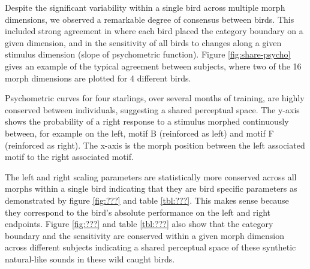 Despite the significant variability within a single bird across multiple morph dimensions, we observed a remarkable degree of consensus between birds.  This included strong agreement in where each bird placed the category boundary on a given dimension, and in the sensitivity of all birds to changes along a given stimulus dimension (slope of psychometric function). Figure \ref{fig:share-psycho} gives an example of the typical agreement between subjects, where two of the 16 morph dimensions are plotted for 4 different birds.

Psychometric curves for four starlings, over several months of training, are highly conserved between individuals, suggesting a shared perceptual space. The y-axis shows the probability of a right response to a stimulus morphed continuously between, for example on the left, motif B (reinforced as left) and motif F (reinforced as right). The x-axis is the morph position between the left associated motif to the right associated motif.


The left and right scaling parameters are statistically more conserved across all morphs within a single bird indicating that they are bird specific parameters as demonstrated by figure \ref{fig:???} and table \ref{tbl:???}. This makes sense because they correspond to the bird's absolute performance on the left and right endpoints. Figure \ref{fig:???} and table \ref{tbl:???} also show that the category boundary and the sensitivity are conserved within a given morph dimension across different subjects indicating a shared perceptual space of these synthetic natural-like sounds in these wild caught birds. 


